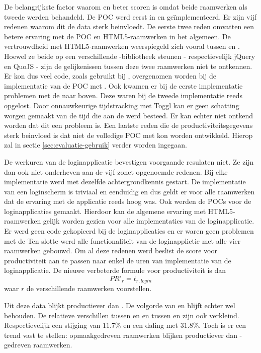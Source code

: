 De belangrijkste factor waarom \lungo{} en \kendo{} beter scoren is omdat beide raamwerken als tweede werden behandeld.
De POC werd eerst in \jqm{} en \st{} geïmplementeerd.
Er zijn vijf redenen waarom dit de data sterk beinvloedt.
De eerste twee reden omvatten een betere ervaring met de POC en HTML5-raamwerken in het algemeen.
De vertrouwdheid met HTML5-raamwerken weerspiegeld zich vooral tussen \jqm{} en \lungo{}.
Hoewel ze beide op een verschillende \js{}-bibliotheek steunen - respectievelijk jQuery en QuoJS - zijn de gelijkenissen tussen deze twee raamwerken niet te ontkennen.
Er kon dus veel code,  zoals gebruikt bij \jqm{},  overgenomen worden bij de implementatie van de POC met \lungo.
Ook kwamen er bij de eerste implementatie problemen met de  naar boven.
Deze waren bij de tweede implementatie reeds opgelost.
Door onnauwkeurige tijdstracking met Toggl kan er geen schatting worgen gemaakt van de tijd die aan de  werd besteed.
Er kan echter niet ontkend worden dat dit een probleem is. %
Een laatste reden die de productiviteitsgegevens sterk beinvloed is dat niet de volledige POC met \lungo{} kon worden ontwikkeld.
Hierop zal in sectie \ref{sec:evaluatie-gebruik} verder worden ingegaan.

De werkuren van de loginapplicatie bevestigen voorgaande resulaten niet.
Ze zijn dan ook niet onderheven aan de vijf zonet opgenoemde redenen.
Bij elke implementatie werd met dezelfde achtergrondkennis gestart.  
De implementatie van een loginscherm is triviaal en eenduidig en dus geldt er voor alle raamwerken dat de ervaring met de applicatie reeds hoog was.
Ook werden de POCs voor de loginapplicaties gemaakt.
Hierdoor kan de algemene ervaring met HTML5-raamwerken gelijk worden gezien voor alle implementaties van de loginapplicatie.
Er werd geen code gekopieerd bij de loginapplicaties en er waren geen problemen met de 
Ten slotte werd alle functionaliteit van de loginapplictie met alle vier raamwerken gebouwd.
Om al deze redenen werd beslist de score voor productiviteit aan te passen naar enkel de uren van implementatie van de loginapplicatie.
De nieuwe verbeterde formule voor productiviteit is dan
\begin{equation}
  PR'_r = t_{r,login}
  \label{eq:productiviteit-enhanced}
\end{equation}
waar $r$ de verschillende raamwerken voorstellen.

Uit deze data blijkt \jqm{} productiever dan \lungo{}. 
De volgorde van \kendo{} en \st{} blijft echter wel behouden.
De relatieve verschillen tussen \jqm{} en \lungo{} en tussen \st{} en \kendo{} zijn ook verkleind.  
Respectievelijk een stijging van $11.7\%$ en een daling met $31.8\%$.
Toch is er een trend vast te stellen:  opmaakgedreven raamwerken blijken productiever dan \js-gedreven raamwerken.

